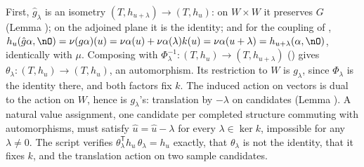 First, $\hat g_\lambda$ is an isometry $(T, h_{u+\lambda}) \to (T, h_u)$: on $W \times W$ it preserves $G$ (Lemma ); on the adjoined plane it is the identity; and for the coupling of , $h_u(\hat g\alpha, \nO) = \nu(g\alpha)(u) = \nu\alpha(u) + \nu\alpha(\lambda)k(u) = \nu\alpha(u + \lambda) = h_{u+\lambda}(\alpha, \nO)$, identically with $\mu$. Composing with $\Phi_\lambda^{-1} : (T, h_u) \to (T, h_{u+\lambda})$ () gives $\theta_\lambda : (T, h_u) \to (T, h_u)$, an automorphism. Its restriction to $W$ is $g_\lambda$, since $\Phi_\lambda$ is the identity there, and both factors fix $k$. The induced action on vectors is dual to the action on $W$, hence is $g_\lambda$'s: translation by $-\lambda$ on candidates (Lemma ). A natural value assignment, one candidate per completed structure commuting with automorphisms, must satisfy $\hat u = \hat u - \lambda$ for every $\lambda \in \ker k$, impossible for any $\lambda \neq 0$. The script verifies $\theta_\lambda^{\mathsf{T}} h_u\, \theta_\lambda = h_u$ exactly, that $\theta_\lambda$ is not the identity, that it fixes $k$, and the translation action on two sample candidates.
